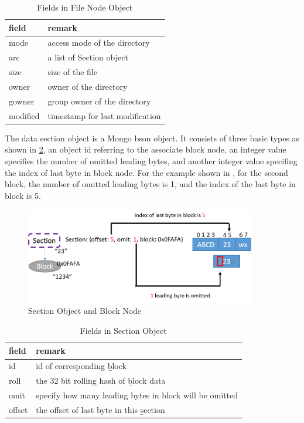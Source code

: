 \begin{table}
\caption{Fields in File Node Object}
\label{tab:file_fields}
\begin{center}
\begin{tabular}{ll}
\toprule
field & remark\\
\midrule
mode & access mode of the directory\\
arc & a list of Section object\\
size & size of the file\\
owner & owner of the directory\\
gowner & group owner of the directory\\
modified & timestamp for last modification\\
\bottomrule
\end{tabular}
\end{center}
\end{table}

    The data section object is a Mongo bson object. It consists of three basic types as shown in \ref{tab:section_fields}, an object id referring to the associate block node, an integer value specifies the number of omitted leading bytes, and another integer value specifing the index of last byte in block node. For the example shown in , for the second block, the number of omitted leading bytes is 1, and the index of the last byte in block is 5.

\begin{figure}[hbtp]
\centering
\includegraphics[width=0.9\textwidth]{Chapter-3/figs/fig9.png}
\caption{Section Object and Block Node}
\label{fig:section_and_block}
\end{figure}

\begin{table}
\caption{Fields in Section Object}
\label{tab:section_fields}
\begin{center}
\begin{tabular}{ll}
\toprule
field & remark\\
\midrule
id & id of corresponding \b{block}\\
roll & the 32 bit rolling hash of \b{block} data\\
omit & specify how many leading bytes in block will be omitted\\
offset & the offset of last byte in this \b{section}\\
\bottomrule
\end{tabular}
\end{center}
\end{table}

